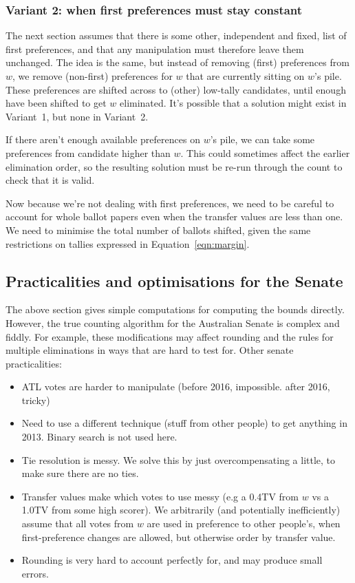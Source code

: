\documentclass[10pt,a4paper]{article}
\begin{document}
\subsubsection{Variant 2: when first preferences must stay constant}
The next section assumes that there is some other, independent and fixed, list of first preferences, and that any manipulation must therefore leave them unchanged.  The idea is the same, but instead of removing (first) preferences from $w$, we remove (non-first) preferences for $w$ that are currently sitting on $w$'s pile.  These preferences are shifted across to (other) low-tally candidates, until enough have been shifted to get $w$ eliminated.  It's possible that a solution might exist in Variant~1, but none in Variant~2.

If there aren't enough available preferences on $w$'s pile, we can take some preferences from candidate higher than $w$.  This could sometimes affect the earlier elimination order, so the resulting solution must be re-run through the count to check that it is valid.

Now because we're not dealing with first preferences, we need to be careful to account for whole ballot papers even when the transfer values are less than one.  We need to minimise the total number of ballots shifted, given the same restrictions on tallies expressed in Equation~\ref{eqn:margin}.


\subsection{Practicalities and optimisations for the Senate}
The above section gives simple computations for computing the bounds directly.  However, the true counting algorithm for the Australian Senate is complex and fiddly.  For example, these modifications may affect rounding and the rules for multiple eliminations in ways that are hard to test for.  Other senate practicalities:
\begin{itemize}
\item  ATL votes are harder to manipulate (before 2016, impossible. after 2016, tricky)
\item  Need to use a different technique (stuff from other people) to get anything in 2013. Binary search is not used here.
\item  Tie resolution is messy.  We solve this by just overcompensating a little, to make sure there are no ties.
\item  Transfer values make which votes  to use messy (e.g a 0.4TV from $w$ vs a 1.0TV from some high scorer). We arbitrarily (and potentially inefficiently) assume that all votes from $w$ are used in preference to other people’s, when first-preference changes are allowed, but otherwise order by transfer value.    
\item Rounding is very hard to account perfectly for, and may produce small errors.
\end{itemize}
\end{document}
